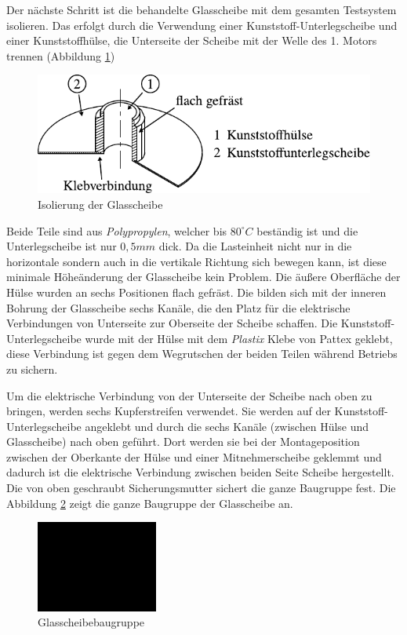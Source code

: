 Der nächste Schritt ist die behandelte Glasscheibe mit dem gesamten Testsystem isolieren.
Das erfolgt durch die Verwendung einer Kunststoff-Unterlegscheibe und einer Kunststoffhülse, die Unterseite der Scheibe mit der Welle des 1. Motors trennen (Abbildung \ref{fig:isolierung_der_glassscheibe})
\begin{figure}[htb]
    \centering
    \includegraphics[]{./images/isolierung_der_scheibe.pdf}
    \caption{Isolierung der Glasscheibe}
    \label{fig:isolierung_der_glassscheibe}
\end{figure}
%

Beide Teile sind aus \textit{Polypropylen}, welcher bis $80 ^\circ C$ beständig ist und die Unterlegscheibe ist nur $0,5 mm$ dick.
Da die Lasteinheit nicht nur in die horizontale sondern auch in die vertikale Richtung sich bewegen kann, ist diese minimale Höheänderung der Glasscheibe kein Problem.
Die äußere Oberfläche der Hülse wurden an sechs Positionen flach gefräst. Die bilden sich mit der inneren Bohrung der Glasscheibe sechs Kanäle, die den Platz für die elektrische Verbindungen von Unterseite zur Oberseite der Scheibe schaffen.
Die Kunststoff-Unterlegscheibe wurde mit der Hülse mit dem \textit{Plastix} Klebe von Pattex geklebt, diese Verbindung ist gegen dem Wegrutschen der beiden Teilen während Betriebs zu sichern.

Um die elektrische Verbindung von der Unterseite der Scheibe nach oben zu bringen, werden sechs Kupferstreifen verwendet.
Sie werden auf der Kunststoff-Unterlegscheibe angeklebt und durch die sechs Kanäle (zwischen Hülse und Glasscheibe) nach oben geführt.
Dort werden sie bei der Montageposition zwischen der Oberkante der Hülse und einer Mitnehmerscheibe geklemmt und dadurch ist die elektrische Verbindung zwischen beiden Seite Scheibe hergestellt.
Die von oben geschraubt Sicherungsmutter sichert die ganze Baugruppe fest.
Die Abbildung \ref{fig:glasscheibebaugruppe} zeigt die ganze Baugruppe der Glasscheibe an.
\begin{figure}[htb]
    \centering
    \includegraphics[width=4cm]{./images/blank_img.jpg}
    \caption{Glasscheibebaugruppe}
    \label{fig:glasscheibebaugruppe}
\end{figure}
%

